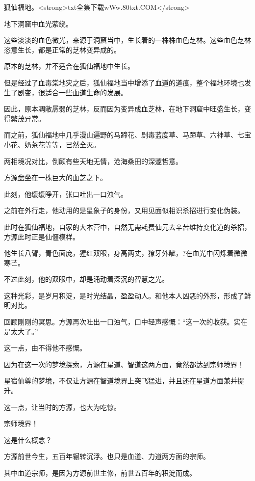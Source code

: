 
\begin{this_body}

狐仙福地。<strong>txt全集下载wWw.80txt.COM</strong>

地下洞窟中血光萦绕。

这些淡淡的血色微光，来源于洞窟当中，生长着的一株株血色芝林。这些血色芝林恣意生长，都是正常的芝林变异成的。

原本的芝林，并不适合在狐仙福地中生长。

但是经过了血毒棠地灾之后，狐仙福地当中增添了血道的道痕，整个福地环境也发生了剧变，很适合一些血道生命的发展。

因此，原本凋敝孱弱的芝林，反而因为变异成血芝林，在地下洞窟中旺盛生长，变得繁茂异常。

而之前，狐仙福地中几乎漫山遍野的马蹄花、剧毒蓝度草、马蹄草、六神草、七宝小花、奶茶花等等，已然全灭。

两相境况对比，倒颇有些天地无情，沧海桑田的深邃哲意。

方源盘坐在一株巨大的血芝之下。

此刻，他缓缓睁开，张口吐出一口浊气。

之前在外行走，他动用的是星象子的身份，又用见面似相识杀招进行变化伪装。

此时在狐仙福地，自家的大本营中，自然无需耗费仙元去辛苦维持变化道的杀招，方源此时正是仙僵模样。

他生长八臂，青色面庞，猩红双眼，身高两丈，獠牙外龇，?在血光中闪烁着微微寒芒。

不过此刻，他的双眼中，却是涌动着深沉的智慧之光。

这种光彩，是岁月积淀，是时光结晶，盈盈动人。和他本人凶恶的外形，形成了鲜明对比。

回顾刚刚的冥思。方源再次吐出一口浊气，口中轻声感慨：“这一次的收获。实在是太大了。”

这一点，由不得他不感慨。

因为在这一次的梦境探索，方源在星道、智道这两方面，竟然都达到宗师境界！

星宿仙尊的梦境，不仅让方源在智道境界上突飞猛进，并且还在星道方面兼并提升。

这一点，让当时的方源，也大为吃惊。

宗师境界！

这是什么概念？

方源前世今生，五百年辗转沉浮。也只是血道、力道两方面的宗师。

其中血道宗师，是因为方源前世主修，前世五百年的积淀而成。


\end{this_body}
